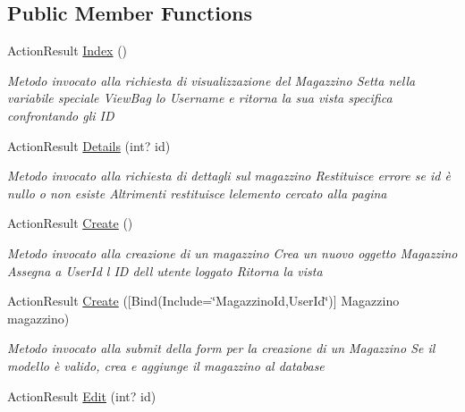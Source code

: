 \subsection*{Public Member Functions}
\begin{DoxyCompactItemize}
\item 
Action\+Result \mbox{\hyperlink{class_brew_day2_1_1_controllers_1_1_magazzino_controller_ab7b2e642a6b0cecd96d4882d3d4431bc}{Index}} ()
\begin{DoxyCompactList}\small\item\em Metodo invocato alla richiesta di visualizzazione del Magazzino Setta nella variabile speciale View\+Bag lo Username e ritorna la sua vista specifica confrontando gli ID \end{DoxyCompactList}\item 
Action\+Result \mbox{\hyperlink{class_brew_day2_1_1_controllers_1_1_magazzino_controller_a81997006a07ff282ba98b7cc31dfac9a}{Details}} (int? id)
\begin{DoxyCompactList}\small\item\em Metodo invocato alla richiesta di dettagli sul magazzino Restituisce errore se id è nullo o non esiste Altrimenti restituisce l\textquotesingle{}elemento cercato alla pagina \end{DoxyCompactList}\item 
Action\+Result \mbox{\hyperlink{class_brew_day2_1_1_controllers_1_1_magazzino_controller_a4a20bb6e042743a3cd258cebfd4ad953}{Create}} ()
\begin{DoxyCompactList}\small\item\em Metodo invocato alla creazione di un magazzino Crea un nuovo oggetto Magazzino Assegna a User\+Id l\textquotesingle{} ID dell\textquotesingle{} utente loggato Ritorna la vista \end{DoxyCompactList}\item 
Action\+Result \mbox{\hyperlink{class_brew_day2_1_1_controllers_1_1_magazzino_controller_a486782c46e67cd8f68b402afb4e80814}{Create}} (\mbox{[}Bind(Include=\char`\"{}Magazzino\+Id,User\+Id\char`\"{})\mbox{]} Magazzino magazzino)
\begin{DoxyCompactList}\small\item\em Metodo invocato alla submit della form per la creazione di un Magazzino Se il modello è valido, crea e aggiunge il magazzino al database \end{DoxyCompactList}\item 
Action\+Result \mbox{\hyperlink{class_brew_day2_1_1_controllers_1_1_magazzino_controller_a8822a7c1a8acad0baddec3c39f522d28}{Edit}} (int? id)

\end{DoxyCompactItemize}
